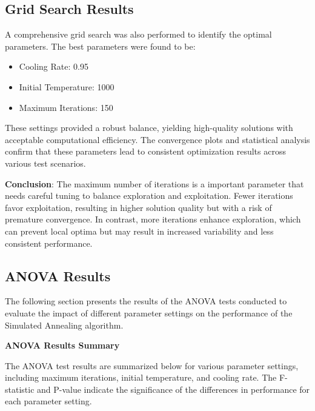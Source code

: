 \documentclass{article}
\begin{document}
    \subsection{Grid Search Results}
    A comprehensive grid search was also performed to identify the optimal parameters. The best parameters were found to be:
    \begin{itemize}
        \item Cooling Rate: 0.95
        \item Initial Temperature: 1000
        \item Maximum Iterations: 150
    \end{itemize}
    These settings provided a robust balance, yielding high-quality solutions with acceptable computational efficiency. The convergence plots and statistical analysis confirm that these parameters lead to consistent optimization results across various test scenarios.

    \textbf{Conclusion}: The maximum number of iterations is a important parameter that needs careful tuning to balance exploration and exploitation. Fewer iterations favor exploitation, resulting in higher solution quality but with a risk of premature convergence. In contrast, more iterations enhance exploration, which can prevent local optima but may result in increased variability and less consistent performance.

    \subsection{ANOVA Results}

    The following section presents the results of the ANOVA tests conducted to evaluate the impact of different parameter settings on the performance of the Simulated Annealing algorithm.

    \textbf{ANOVA Results Summary}

    The ANOVA test results are summarized below for various parameter settings, including maximum iterations, initial temperature, and cooling rate. The F-statistic and P-value indicate the significance of the differences in performance for each parameter setting.
\end{document}
